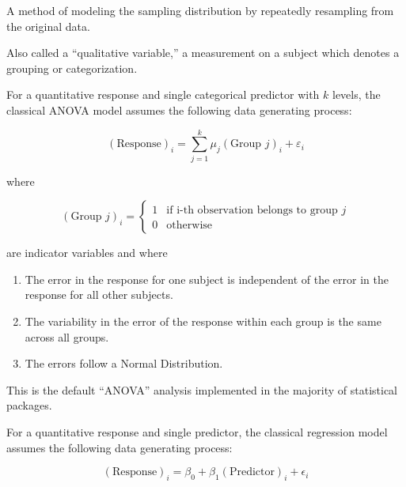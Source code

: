 \documentclass[
  letterpaper,
  DIV=11,
  numbers=noendperiod]{scrreprt}
\providecommand{\tightlist}{%
  \setlength{\itemsep}{0pt}\setlength{\parskip}{0pt}}\usepackage{longtable,booktabs,array}
\theoremstyle{definition}
\theoremstyle{definition}
\theoremstyle{plain}
\theoremstyle{remark}
\begin{document}
\begin{description}
\tightlist
\item[Bootstrapping (Definition~\ref{def-bootstrap})]
A method of modeling the sampling distribution by repeatedly resampling
from the original data.
\item[Categorical Variable (Definition~\ref{def-categorical})]
Also called a ``qualitative variable,'' a measurement on a subject which
denotes a grouping or categorization.
\item[Classical ANOVA Model (Definition~\ref{def-classical-anova})]
For a quantitative response and single categorical predictor with \(k\)
levels, the classical ANOVA model assumes the following data generating
process:
\end{description}

\[(\text{Response})_i = \sum_{j=1}^{k} \mu_j (\text{Group } j)_i + \varepsilon_i\]

where

\[
(\text{Group } j)_{i} = \begin{cases}
  1 & \text{if i-th observation belongs to group } j \\
  0 & \text{otherwise}
  \end{cases}
\]

are indicator variables and where

\begin{enumerate}
\def\labelenumi{\arabic{enumi}.}
\tightlist
\item
  The error in the response for one subject is independent of the error
  in the response for all other subjects.
\item
  The variability in the error of the response within each group is the
  same across all groups.
\item
  The errors follow a Normal Distribution.
\end{enumerate}

This is the default ``ANOVA'' analysis implemented in the majority of
statistical packages.

\begin{description}
\tightlist
\item[Classical Regression Model
(Definition~\ref{def-classical-regression})]
For a quantitative response and single predictor, the classical
regression model assumes the following data generating process:
\end{description}

\[(\text{Response})_i = \beta_0 + \beta_1 (\text{Predictor})_{i} + \epsilon_i\]
\end{document}
